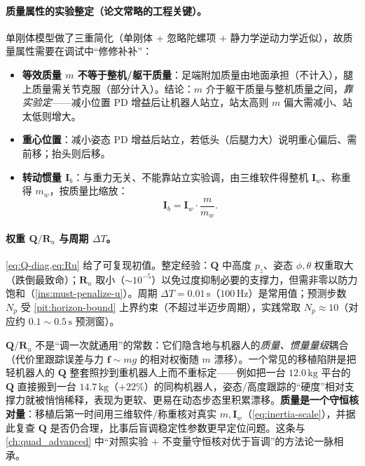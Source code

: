 \paragraph{ 质量属性的实验整定（论文常略的工程关键）。}
单刚体模型做了三重简化（单刚体 + 忽略陀螺项 + 静力学逆动力学近似），故质量属性需要在调试中“修修补补”\cite{unitree2023quadruped}：
\begin{itemize}
  \item \textbf{等效质量 $m$ 不等于整机/躯干质量}：足端附加质量由地面承担（不计入），腿上质量需关节克服（部分计入）。结论：$m$ 介于躯干质量与整机质量之间，\emph{靠实验定}——减小位置 PD 增益后让机器人站立，站太高则 $m$ 偏大需减小、站太低则增大。
  \item \textbf{重心位置}：减小姿态 PD 增益后站立，若低头（后腿力大）说明重心偏后、需前移；抬头则后移。
  \item \textbf{转动惯量 $\mathbf{I}_b$}：与重力无关、不能靠站立实验调，由三维软件得整机 $\mathbf{I}_w$、称重得 $m_w$，按质量比缩放\cite{unitree2023quadruped}：
  \begin{equation}
    \mathbf{I}_b=\mathbf{I}_w\cdot\frac{m}{m_w}.
    \label{eq:inertia-scale}
  \end{equation}
\end{itemize}

\paragraph{ 权重 $\mathbf{Q}/\mathbf{R}_u$ 与周期 $\Delta T$。}
\cref{eq:Q-diag,eq:Ru} 给了可复现初值。整定经验：$\mathbf{Q}$ 中高度 $p_z$、姿态 $\phi,\theta$ 权重取大（跌倒最致命）；$\mathbf{R}_u$ 取小（$\sim10^{-5}$）以免过度抑制必要的支撑力，但需非零以防力饱和（\cref{ins:must-penalize-u}）。周期 $\Delta T=0.01\,\mathrm{s}$（$100\,\mathrm{Hz}$）是常用值；预测步数 $N_p$ 受 \cref{pit:horizon-bound} 上界约束（不超过半迈步周期），实践常取 $N_p\approx10$（对应约 $0.1\sim0.5\,\mathrm{s}$ 预测窗）。

\begin{pitfall}\label{pit:Q-mass-rescale}
$\mathbf{Q}/\mathbf{R}_u$ 不是“调一次就通用”的常数：它们隐含地与机器人的\emph{质量、惯量量级}耦合（代价里跟踪误差与力 $\mathbf{f}\sim mg$ 的相对权衡随 $m$ 漂移）。一个常见的移植陷阱是把轻机器人的 $\mathbf{Q}$ 整套照抄到重机器人上而不重标定——例如把一台 $12.0\,\mathrm{kg}$ 平台的 $\mathbf{Q}$ 直接搬到一台 $14.7\,\mathrm{kg}$（$+22\%$）的同构机器人，姿态/高度跟踪的“硬度”相对支撑力就被悄悄稀释，表现为更软、更易在动态步态里积累漂移。\textbf{质量是一个守恒核对量}：移植后第一时间用三维软件/称重核对真实 $m,\mathbf{I}_w$（\cref{eq:inertia-scale}），并据此复查 $\mathbf{Q}$ 是否仍合理，比事后盲调稳定性参数更早定位问题。这条与 \cref{ch:quad_advanced} 中“对照实验 $+$ 不变量守恒核对优于盲调”的方法论一脉相承。
\end{pitfall}

